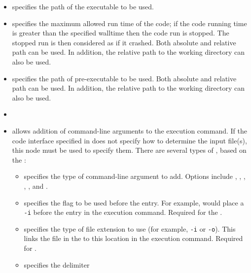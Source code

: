 \subnodesIntro
%
\begin{itemize}
  \item {}  specifies the path
  of the executable to be used.

  \item {}   specifies the maximum
  allowed run time of the code; if the code running time is greater than the specified
  walltime then the code run is stopped. The stopped run is then considered as if it crashed.
  \nb Both absolute and relative path can be used. In addition, the relative path
  to the working directory can also be used.
  \item {}  specifies the path of
    pre-executable to be used.
  \nb Both absolute and relative path can be used. In addition, the relative path
  to the working directory can also be used.
  \item {}
  \item {}  allows addition of
  command-line arguments to the execution command.  If the code interface
  specified in   does not specify how to
  determine the input file(s), this node must be used to specify them.
  There are several types of , based on the :
  \begin{itemize}
    \item {}  specifies the type of
    command-line argument to add.  Options include ,
    , , ,
    , and .
    \item {}  specifies the flag to
    be used before the entry.  For example,  would
    place a \texttt{-i} before the entry in the execution command.  Required for
    the  .
    \item {}  specifies the type
    of file extension to use (for example, \texttt{-i} or \texttt{-o}).  This links the
     file in the  to this location in the execution
    command.  Required for  .
    \item {}  specifies the delimiter

\end{itemize}
\end{itemize}
